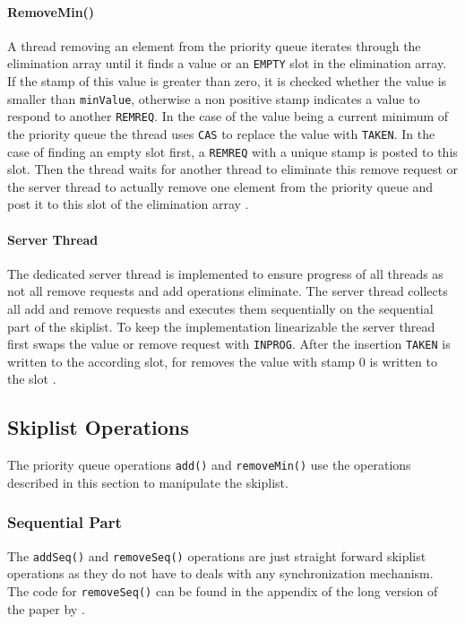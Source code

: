 \paragraph{RemoveMin()} A thread removing an element from the priority queue iterates through the elimination array until it finds a value or an \texttt{EMPTY} slot in the elimination array. If the stamp of this value is greater than zero, it is checked whether the value is smaller than \texttt{minValue}, otherwise a non positive stamp indicates a value to respond to another \texttt{REMREQ}. In the case of the value being a current minimum of the priority queue the thread uses \texttt{CAS} to replace the value with \texttt{TAKEN}. In the case of finding an empty slot first, a \texttt{REMREQ} with a unique stamp is posted to this slot. Then the thread waits for another thread to eliminate this remove request or the server thread to actually remove one element from the priority queue and post it to this slot of the elimination array \cite{calciu_adaptive_2014}.

\paragraph{Server Thread} The dedicated server thread is implemented to ensure progress of all threads as not all remove requests and add operations eliminate. The server thread collects all add and remove requests and executes them sequentially on the sequential part of the skiplist. To keep the implementation linearizable the server thread first swaps the value or remove request with \texttt{INPROG}. After the insertion \texttt{TAKEN} is written to the according slot, for removes the value with stamp 0 is written to the slot \cite{calciu_adaptive_2014}.

\subsection{Skiplist Operations}

The priority queue operations \texttt{add()} and \texttt{removeMin()} use the operations described in this section to manipulate the skiplist.

\subsubsection{Sequential Part}

The \texttt{addSeq()} and \texttt{removeSeq()} operations are just straight forward skiplist operations as they do not have to deals with any synchronization mechanism. The code for \texttt{removeSeq()} can be found in the appendix of the long version of the paper by  \citeauthor{calciu_adaptive_2014-1} \cite{calciu_adaptive_2014-1}.

